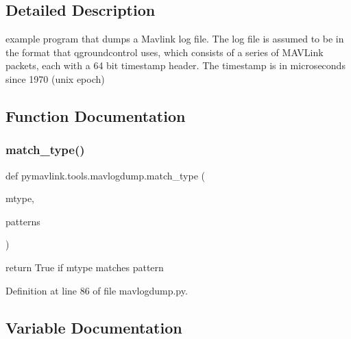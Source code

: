 \subsection{Detailed Description}
\begin{DoxyVerb}example program that dumps a Mavlink log file. The log file is
assumed to be in the format that qgroundcontrol uses, which consists
of a series of MAVLink packets, each with a 64 bit timestamp
header. The timestamp is in microseconds since 1970 (unix epoch)
\end{DoxyVerb}
 

\subsection{Function Documentation}
\mbox{\label{namespacepymavlink_1_1tools_1_1mavlogdump_a6d6e4b627922cd7882784716f7f8db1f}} 
\subsubsection{\texorpdfstring{match\_type()}{match\_type()}}
{\footnotesize\ttfamily def pymavlink.\+tools.\+mavlogdump.\+match\+\_\+type (\begin{DoxyParamCaption}\item[{}]{mtype,  }\item[{}]{patterns }\end{DoxyParamCaption})}

\begin{DoxyVerb}return True if mtype matches pattern\end{DoxyVerb}
 

Definition at line 86 of file mavlogdump.\+py.



\subsection{Variable Documentation}
\mbox{\label{namespacepymavlink_1_1tools_1_1mavlogdump_a0d6aaf7db0ab044f6fccc41aef82b384}} 

